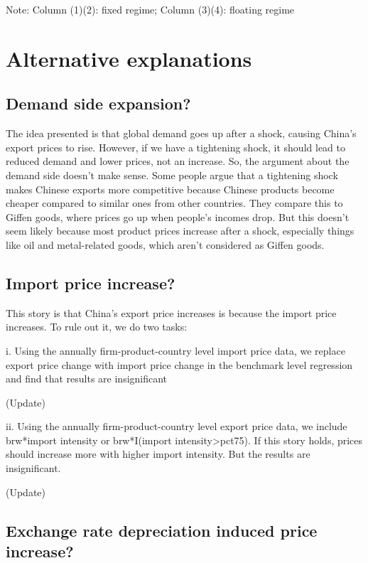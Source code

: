 \documentclass[12pt]{article}
\begin{document}
 
Note: Column (1)(2): fixed regime; Column (3)(4): floating regime


\section{Alternative explanations}

\subsection{Demand side expansion?}

The idea presented is that global demand goes up after a shock, causing China's export prices to rise. However, if we have a tightening shock, it should lead to reduced demand and lower prices, not an increase. So, the argument about the demand side doesn't make sense. Some people argue that a tightening shock makes Chinese exports more competitive because Chinese products become cheaper compared to similar ones from other countries. They compare this to Giffen goods, where prices go up when people's incomes drop. But this doesn't seem likely because most product prices increase after a shock, especially things like oil and metal-related goods, which aren't considered as Giffen goods.

\subsection{Import price increase?}

This story is that China’s export price increases is because the import price increases. To rule out it, we do two tasks:

i. Using the annually firm-product-country level import price data, we replace export price change with import price change in the benchmark level regression and find that results are insignificant

(Update)

ii. Using the annually firm-product-country level export price data, we include brw*import intensity or brw*I(import intensity>pct75). If this story holds, prices should increase more with higher import intensity. But the results are insignificant.

(Update)

\subsection{Exchange rate depreciation induced price increase?}
\end{document}
